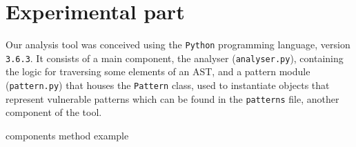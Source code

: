 \section*{Experimental part}
\label{sec:experimental}

Our analysis tool was conceived using the \verb|Python| programming language,
version \verb|3.6.3|. It consists of a main component, the analyser
(\verb|analyser.py|), containing the logic for traversing some elements of an
AST, and a pattern module (\verb|pattern.py|) that houses the \verb|Pattern|
class, used to instantiate objects that represent vulnerable patterns which can
be found in the \verb|patterns| file, another component of the tool.

{components}
{method}
{example}
\clearpage
